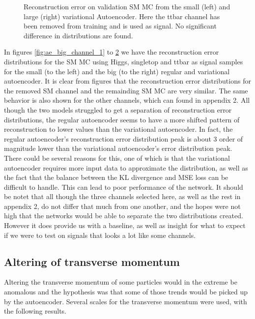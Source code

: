 \begin{figure}[h!]
\begin{subfigure}{.45\textwidth}
        \caption{ }
        \label{fig:vae_big_ttbar}
    \end{subfigure}
    \hfill 
    \caption[VAE | Reconstruction error using ttbar channel as signal]{Reconstruction error on validation SM MC from the small (left) and large (right) variational Autoencoder. Here the ttbar channel has been removed from training and 
    is used as signal. No significant difference in distributions are found.  }
    \label{fig:vae_big_channel_3}
\end{figure}

In figures \ref{fig:ae_big_channel_1} to \ref{fig:vae_big_channel_3} we have the reconstruction error distributions for the SM MC using 
Higgs, singletop and ttbar as signal samples for the small (to the left) and the big (to the right) regular and variational autoencoder. 
It is clear from figures that the reconstruction error distributions for the removed SM channel and the remainding SM MC are very similar. 
The same behavior is also shown for the other channels, which can found in appendix 2. All though the two models struggled to get a 
separation of reconstruction error distributions, the regular autoencoder seems to have a more shifted pattern of reconstruction to lower 
values than the variational autoencoder. In fact, the regular autoencoder's reconstruction error distribution peak is about 3 order of 
magnitude lower than the variational autoencoder's error distribution peak. There could be several reasons for this, one of which is that 
the variational autoencoder requires more input data to approximate the distribution, as well as the fact that the balance between the KL divergence and MSE loss 
can be difficult to handle\cite{kl_mse_balance}. This can lead to poor performance of the network. It should be notet that all though the 
three channels selected here, as well as the rest in appendix 2, do not differ that much from one another, and the hopes were not high that 
the networks would be able to separate the two distributions created. However it does provide us with a baseline, as well as insight for what 
to expect if we were to test on signals that looks a lot like some channels. 


\newpage


\subsection*{Altering of transverse momentum}
Altering the transverse momentum of some particles would in the extreme be anomalous and the hypothesis was that some of those trends would be
picked up by the autoencoder. Several scales for the transverse momentum were used, with the following results.


